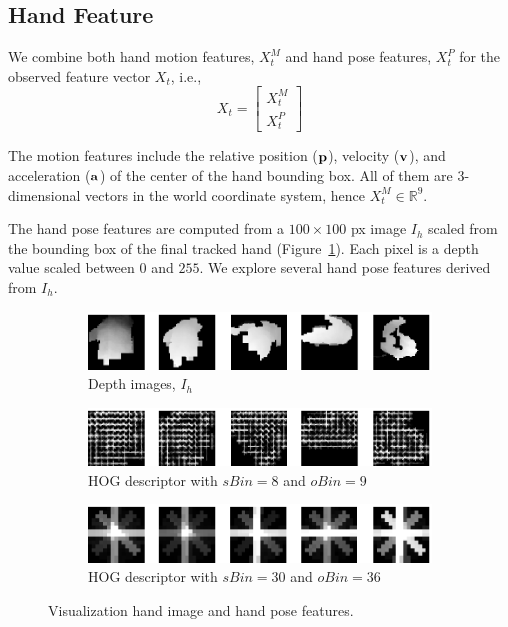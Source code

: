 \documentclass{acm_proc_article-sp}
\begin{document}
\subsection{Hand Feature}
We combine both hand motion features, $X^M_t$ and hand pose features, $X^P_t$
for the observed feature vector $X_t$, i.e., 
\begin{displaymath}
X_t = \left[ \begin{array}{c}
X^M_t\\
X^P_t
\end{array}\right]
\end{displaymath} 

The motion features include the relative position ($\bf{p}$), velocity ($\bf{v}$),
and acceleration ($\bf{a}$) of the center of
the hand bounding box.
All of them are 3-dimensional vectors in the world
coordinate system, hence $X_t^M\in\mathbb{R}^9$. 

The hand pose features are computed from a $100 \times 100$ px image $I_{h}$ scaled
from the bounding box of the final tracked hand (Figure~\ref{fig:depth}). Each pixel
is a depth value scaled between $0$ and $255$. We explore several hand pose 
features derived from $I_h$.

\begin{figure}
\centering
\begin{subfigure}{1\columnwidth}
\includegraphics[width=1\columnwidth]{fig/hand-depth.ps}
\caption{Depth images, $I_h$}
\label{fig:depth}
\end{subfigure}
\begin{subfigure}{1\columnwidth}
\includegraphics[width=1\columnwidth]{fig/hand-hog.ps}
\caption{HOG descriptor with $sBin = 8$ and $oBin = 9$}
\label{fig:hog}
\end{subfigure}
\begin{subfigure}{1\columnwidth}
\includegraphics[width=1\columnwidth]{fig/hand-hog-30-36.ps}
\caption{HOG descriptor with $sBin = 30$ and $oBin = 36$}
\label{fig:hog-30}
\end{subfigure}
\caption{Visualization hand image and hand pose features.}
\label{fig:hand-vis}
\end{figure}
\end{document}
